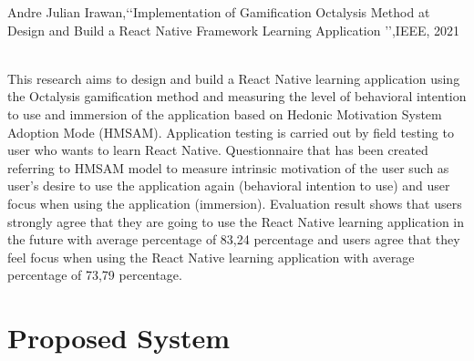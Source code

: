 \documentclass[12pt,a4paper]{report}
\begin{document}
\begin{enumerate}
{\bf\item Andre Julian Irawan,\lq\lq Implementation of Gamification Octalysis Method at Design and Build a React Native Framework Learning Application \rq\rq,IEEE, 2021}
\\
This research aims to design and build a React Native learning application using the Octalysis gamification method and measuring the level of behavioral intention to use and immersion of the application based on Hedonic Motivation System Adoption Mode (HMSAM). Application testing is carried out by field testing to user who wants to learn React Native. Questionnaire that has been created referring to HMSAM model to measure intrinsic motivation of the user such as user's desire to use the application again (behavioral intention to use) and user focus when using the application (immersion). Evaluation result shows that users strongly agree that they are going to use the React Native learning application in the future with average percentage of 83,24 percentage and users agree that they feel focus when using the React Native learning application with average percentage of 73,79 percentage.
\end{enumerate}
\newpage

\chapter{Proposed System}
\end{document}
